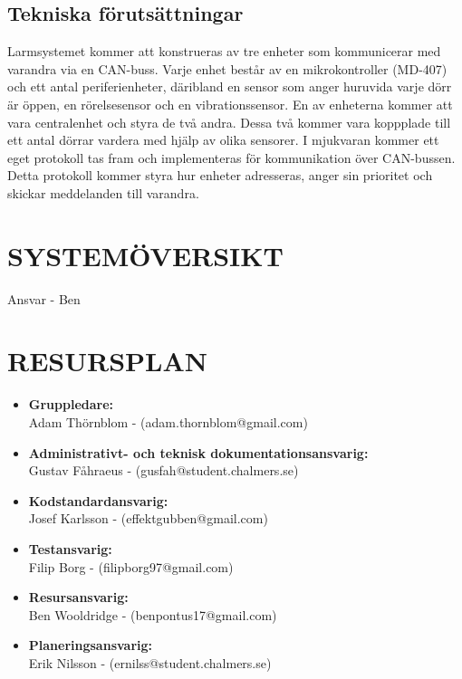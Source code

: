 \documentclass[a4paper]{article}
\begin{document}
\subsection{Tekniska förutsättningar}
\label{sec:tekniskaf}
Larmsystemet kommer att konstrueras av tre enheter som kommunicerar med varandra via en CAN-buss. Varje enhet består av en mikrokontroller (MD-407) och ett antal periferienheter, däribland en sensor som anger huruvida varje dörr är öppen, en rörelsesensor och en vibrationssensor. En av enheterna kommer att vara centralenhet och styra de två andra. Dessa två kommer vara koppplade till ett antal dörrar vardera med hjälp av olika sensorer.
I mjukvaran kommer ett eget protokoll tas fram och implementeras för kommunikation över CAN-bussen. Detta protokoll kommer styra hur enheter adresseras, anger sin prioritet och skickar meddelanden till varandra.



\section{SYSTEMÖVERSIKT}
\label{sec:systemö}

Ansvar - Ben

\section{RESURSPLAN}
\label{sec:resurs}

\begin{itemize}
    \item \textbf{Gruppledare:}
    \\
    Adam Thörnblom - (adam.thornblom@gmail.com)

    \item \textbf{Administrativt- och teknisk dokumentationsansvarig:}
    \\
    Gustav Fåhraeus - (gusfah@student.chalmers.se)

    \item \textbf{Kodstandardansvarig:}
    \\
    Josef Karlsson - (effektgubben@gmail.com)

    \item \textbf{Testansvarig:}
    \\
    Filip Borg - (filipborg97@gmail.com)

    \item \textbf{Resursansvarig:}
    \\
    Ben Wooldridge - (benpontus17@gmail.com)

    \item \textbf{Planeringsansvarig:}
    \\
    Erik Nilsson - (ernilss@student.chalmers.se)
\end{itemize}
\end{document}
